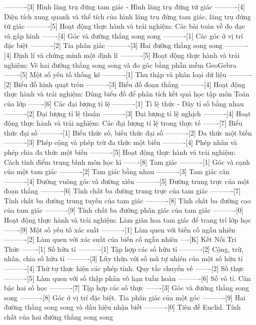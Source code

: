 ----------[3] Hình lăng trụ đứng tam giác - Hình lăng trụ đứng tứ giác
----------[4] Diện tích xung quanh và thể tích của hình lăng trụ đứng tam giác, lăng trụ đứng tứ giác
----------[5] Hoạt động thực hành và trải nghiệm: Các bài toán về đo đạc và gấp hình
-------[4] Góc và đường thẳng song song
----------[1] Các góc ở vị trí đặc biệt
----------[2] Tia phân giác
----------[3] Hai đường thẳng song song
----------[4] Định lí và chứng minh một định lí
----------[5] Hoạt động thực hành và trải nghiệm: Vẽ hai đường thẳng song song và đo góc bằng phần mềm GeoGebra
-------[5] Một số yếu tố thống kê
----------[1] Thu thập và phân loại dữ liệu
----------[2] Biểu đồ hình quạt tròn
----------[3] Biểu đồ đoạn thẳng
----------[4] Hoạt động thực hành và trải nghiệm: Dùng biểu đồ để phân tích kết quả học tập môn Toán của lớp
-------[6] Các đại lượng tỉ lệ
----------[1] Tỉ lệ thức - Dãy tỉ số bằng nhau
----------[2] Đại lượng tỉ lệ thuận
----------[3] Đại lượng tỉ lệ nghịch
----------[4] Hoạt động thực hành và trải nghiệm: Các đại lượng tỉ lệ trong thực tế
-------[7] Biểu thức đại số
----------[1] Biểu thức số, biểu thức đại số
----------[2] Đa thức một biến
----------[3] Phép cộng và phép trừ đa thức một biến
----------[4] Phép nhân và phép chia đa thức một biến
----------[5] Hoạt động thực hành và trải nghiệm: Cách tính điểm trung bình môn học kì
-------[8] Tam giác
----------[1] Góc và cạnh của một tam giác
----------[2] Tam giác bằng nhau
----------[3] Tam giác cân
----------[4] Đường vuông góc và đường xiên
----------[5] Đường trung trực của một đoạn thẳng
----------[6] Tính chất ba đường trung trực của tam giác
----------[7] Tính chất ba đường trung tuyến của tam giác
----------[8] Tính chất ba đường cao của tam giác
----------[9] Tính chất ba đường phân giác của tam giác
----------[0] Hoạt động thực hành và trải nghiệm: Làm giàn hoa tam giác để trang trí lớp học
-------[9] Một số yếu tố xác suất
----------[1] Làm quen với biến cố ngẫu nhiên
----------[2] Làm quen với xác suất của biến cố ngẫu nhiên
----[K] Kết Nối Tri Thức
-------[1] Số hữu tỉ
----------[1] Tập hợp các số hữu tỉ
----------[2] Cộng, trừ, nhân, chia số hữu tỉ
----------[3] Lũy thừa với số mũ tự nhiên của một số hữu tỉ
----------[4] Thứ tự thực hiện các phép tính. Quy tắc chuyển vế
-------[2] Số thực
----------[5] Làm quen với số thập phân vô hạn tuần hoàn
----------[6] Số vô tỉ. Căn bậc hai số học
----------[7] Tập hợp các số thực
-------[3] Góc và đường thẳng song song
----------[8] Góc ở vị trí đặc biệt. Tia phân giác của một góc
----------[9] Hai đường thẳng song song và dấu hiệu nhận biết
----------[0] Tiên đề Euclid. Tính chất của hai đường thẳng song song
